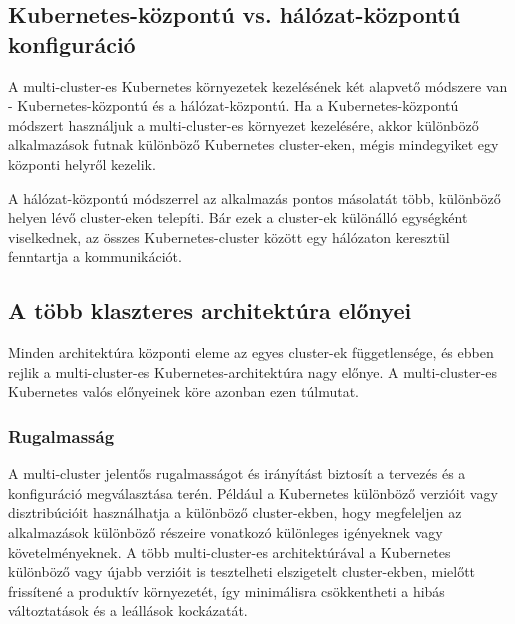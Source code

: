 \subsection{Kubernetes-központú vs. hálózat-központú konfiguráció}
A multi-cluster-es Kubernetes környezetek kezelésének két alapvető módszere van - Kubernetes-központú és a hálózat-központú. Ha a Kubernetes-központú módszert használjuk a multi-cluster-es környezet kezelésére, akkor különböző alkalmazások futnak különböző Kubernetes cluster-eken, mégis mindegyiket egy központi helyről kezelik.

A hálózat-központú módszerrel az alkalmazás pontos másolatát több, különböző helyen lévő cluster-eken telepíti. Bár ezek a cluster-ek különálló egységként viselkednek, az összes Kubernetes-cluster között egy hálózaton keresztül fenntartja a kommunikációt.
\cite{multicluster}

\subsection{A több klaszteres architektúra előnyei}
Minden architektúra központi eleme az egyes cluster-ek függetlensége, és ebben rejlik a multi-cluster-es Kubernetes-architektúra nagy előnye. A multi-cluster-es Kubernetes valós előnyeinek köre azonban ezen túlmutat.
\cite{multicluster}

\subsubsection*{Rugalmasság}
A multi-cluster jelentős rugalmasságot és irányítást biztosít a tervezés és a konfiguráció megválasztása terén. Például a Kubernetes különböző verzióit vagy disztribúcióit használhatja a különböző cluster-ekben, hogy megfeleljen az alkalmazások különböző részeire vonatkozó különleges igényeknek vagy követelményeknek. A több multi-cluster-es architektúrával a Kubernetes különböző vagy újabb verzióit is tesztelheti elszigetelt cluster-ekben, mielőtt frissítené a produktív környezetét, így minimálisra csökkentheti a hibás változtatások és a leállások kockázatát.
\cite{multicluster}

